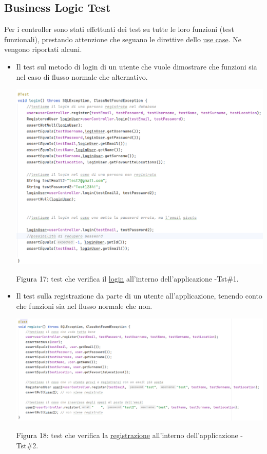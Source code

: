 \documentclass[10pt]{article}
\begin{document}
\subsection{Business Logic Test}

Per i controller sono stati effettuati dei test su tutte le loro funzioni (test funzionali), prestando attenzione che seguano le direttive dello \hyperref[usecase]{use case}.
Ne vengono riportati alcuni. 
\begin{itemize}
\item Il test sul metodo di login di un utente che vuole dimostrare che funzioni sia nel caso di flusso normale che alternativo.
\label{test1}
\begin{center}
\hspace*{-0.75cm}
\includegraphics[scale=0.55]{test/BusinessLogic/login}
\par
Figura 17: test che verifica il \hyperref[Usecase1]{login} all'interno dell'applicazione -Tst\#1.
\par   
\end{center}
\label{test2}
\item Il test sulla registrazione da parte di un utente all'applicazione, tenendo conto che funzioni sia nel flusso normale che non.
\begin{center}
\hspace*{-2cm}
\includegraphics[scale=0.55]{test/BusinessLogic/register}
\par
Figura 18: test che verifica la \hyperref[Usecase4]{registrazione} all'interno dell'applicazione -Tst\#2.
\par\medskip
\end{center}
\end{itemize}
\end{document}
